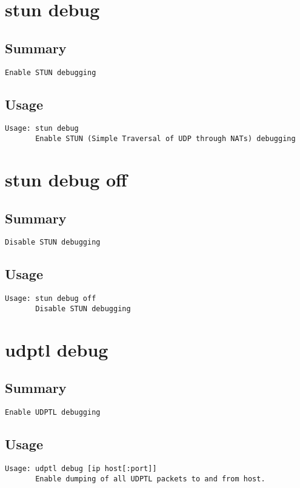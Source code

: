 \section{stun debug}
\subsection{Summary}
\begin{verbatim}
Enable STUN debugging
\end{verbatim}
\subsection{Usage}
\begin{verbatim}
Usage: stun debug
       Enable STUN (Simple Traversal of UDP through NATs) debugging

\end{verbatim}


\section{stun debug off}
\subsection{Summary}
\begin{verbatim}
Disable STUN debugging
\end{verbatim}
\subsection{Usage}
\begin{verbatim}
Usage: stun debug off
       Disable STUN debugging

\end{verbatim}


\section{udptl debug}
\subsection{Summary}
\begin{verbatim}
Enable UDPTL debugging
\end{verbatim}
\subsection{Usage}
\begin{verbatim}
Usage: udptl debug [ip host[:port]]
       Enable dumping of all UDPTL packets to and from host.

\end{verbatim}


